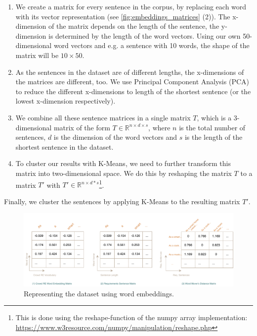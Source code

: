\begin{enumerate}
\item We create a matrix for every sentence in the corpus, by replacing each word with its vector representation (see \autoref{fig:embeddings_matrices} (2)). The x-dimension of the matrix depends on the length of the sentence, the y-dimension is determined by the length of the word vectors. Using our own 50-dimensional word vectors and e.g. a sentence with 10 words, the shape of the matrix will be $10\times50$.
\item As the sentences in the dataset are of different lengths, the x-dimensions of the matrices are different, too. We use Principal Component Analysis (PCA)\,\cite{wold_principal_1987} to reduce the different x-dimensions to length of the shortest sentence (or the lowest x-dimension respectively).
\item We combine all these sentence matrices in a single matrix $T$, which is a 3-dimensional matrix of the form $T\in\mathbb{R}^{n \times d \times s}$, where $n$ is the total number of sentences, $d$ is the dimension of the word vectors and $s$ is the length of the shortest sentence in the dataset.
\item To cluster our results with K-Means, we need to further transform this matrix into two-dimensional space. We do this by reshaping the matrix $T$ to a matrix $T'$ with $T' \in \mathbb{R}^{n \times d * s}$\footnote{This is done using the reshape-function of the numpy array implementation: \url{https://www.w3resource.com/numpy/manipulation/reshape.php}}.
\end{enumerate}
Finally, we cluster the sentences by applying K-Means to the resulting matrix $T'$.

\begin{figure}[ht]
  \begin{center}
    \includegraphics[width=\textwidth]{figures/embedding_matrices.pdf}
    \caption{Representing the \crowdre{} dataset using word embeddings.}
    \label{fig:embeddings_matrices}
  \end{center}
\end{figure}




